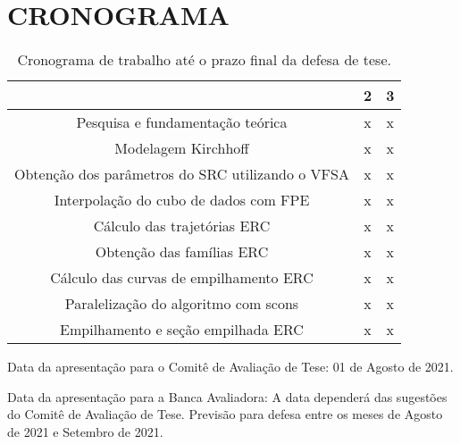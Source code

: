 \chapter{CRONOGRAMA}
\label{cap9:cronograma}


    \begin{table}[H]
      \caption{Cronograma de trabalho até o prazo final da defesa de tese.}
      \centering
      
      \begin{tabular}{|c|c|c|}

      \hline
       & 2 & 3 \\ \hline
      Pesquisa e fundamentação teórica & x & x \\ \hline
      Modelagem Kirchhoff & x & x \\ \hline
      Obtenção dos parâmetros do SRC utilizando o VFSA & x & x \\ \hline
      Interpolação do cubo de dados com FPE & x & x \\ \hline
      Cálculo das trajetórias ERC & x & x \\ \hline
      Obtenção das famílias ERC & x & x \\ \hline
      Cálculo das curvas de empilhamento ERC & x & x \\ \hline
      Paralelização do algoritmo com scons & x & x \\ \hline
      Empilhamento e seção empilhada ERC & x & x  \\
      \hline
      
      \end{tabular}
  \end{table}
  
Data da apresentação para o Comitê de Avaliação de Tese: 01 de Agosto de 2021.
  
Data da apresentação para a Banca Avaliadora: A data dependerá das sugestões do
Comitê de Avaliação de Tese. Previsão para defesa entre os meses de Agosto de
2021 e Setembro de 2021.